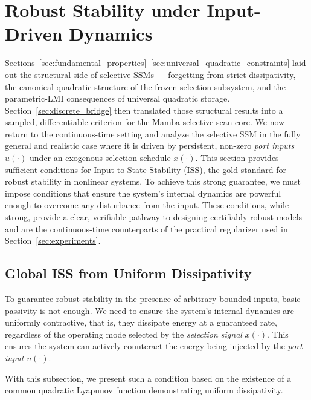 \documentclass[10pt]{article} %
\theoremstyle{definition}
\begin{document}
\section{Robust Stability under Input-Driven Dynamics}
\label{sec:robust_stability}
Sections~\ref{sec:fundamental_properties}--\ref{sec:universal_quadratic_constraints} laid out the structural side of selective SSMs --- forgetting from strict dissipativity, the canonical quadratic structure of the frozen-selection subsystem, and the parametric-LMI consequences of universal quadratic storage. Section~\ref{sec:discrete_bridge} then translated those structural results into a sampled, differentiable criterion for the Mamba selective-scan core. We now return to the continuous-time setting and analyze the selective SSM in the fully general and realistic case where it is driven by persistent, non-zero \emph{port inputs} $u(\cdot)$ under an exogenous selection schedule $x(\cdot)$. This section provides sufficient conditions for Input-to-State Stability (ISS), the gold standard for robust stability in nonlinear systems. To achieve this strong guarantee, we must impose conditions that ensure the system's internal dynamics are powerful enough to overcome any disturbance from the input. These conditions, while strong, provide a clear, verifiable pathway to designing certifiably robust models and are the continuous-time counterparts of the practical regularizer used in Section~\ref{sec:experiments}.

\subsection{Global ISS from Uniform Dissipativity}
To guarantee robust stability in the presence of arbitrary bounded inputs, basic passivity is not enough. We need to ensure the system's internal dynamics are uniformly contractive, that is, they dissipate energy at a guaranteed rate, regardless of the operating mode selected by the \emph{selection signal} $x(\cdot)$. This ensures the system can actively counteract the energy being injected by the \emph{port input} $u(\cdot)$.

With this subsection, we present such a condition based on the existence of a common quadratic Lyapunov function demonstrating uniform dissipativity.
\end{document}
